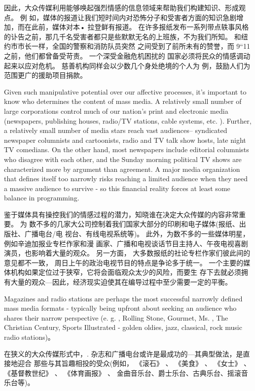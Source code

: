 \documentclass[cs4size, a4paper, 12pt]{article}
\newcounter{numpar}
\newcommand*{\newpar}{\numpar{}}
\begin{document}
	因此，大众传媒利用能够唤起强烈情感的信息领域来帮助我们构建知识、形成观点。 例 如，媒体的报道让我们短时间内对恐怖分子和受害者方面的知识急剧增加，而在此前，媒体对本• 拉登鲜有报道。 在许多报纸发布一系列带点轶事风格的讣告之前，那几千名受害者都只是些默默无名的上班族，不为我们所知。 和纽约市市长一样，全国的警察和消防队员突然 之间受到了前所未有的赞誉，而 9``11 之前，他们都曾备受苛责。 一个深受金融危机困扰的 国家必须将民众的情感调动起来以应对危机。  慈善机构同样会以少数几个身处绝境的个人为 例，鼓励人们为范围更广的援助项目捐款。  
	
	\newpar Given such manipulative potential over our affective processes, it's important to know who determines the content of mass media. A relatively  small number of large corporations control much of our nation's print and electronic media (newspapers, publishing houses, radio/TV stations, cable systems, etc. ). Further, a relatively small number of media stars reach vast audiences-- syndicated newspaper columnists and cartoonists, radio and TV talk show hosts, late night TV comedians. On the other hand,  most newspapers include editorial columnists who disagree with each other, and the Sunday morning political TV shows are characterized more by argument than agreement. A major media organization that defines itself too narrowly risks reaching a limited audience when they need a massive audience to survive - so this financial reality forces at least some balance in programming. 
	
	鉴于媒体具有操控我们的情感过程的潜力，知晓谁在决定大众传媒的内容非常重要。 为 数不多的几家大公司控制着我们国家大部分的印刷和电子媒体(报纸、出版社、广播电台/电 视台、有线电视系统等)。 此外，为数不多的一些媒体明星，例如辛迪加报业专栏作家和漫 画家、广播和电视谈话节目主持人、午夜电视喜剧演员，也影响着大量的观众。 另一方面， 大多数报纸的社论专栏作家们彼此间的意见都不一致， 周日上午的政治电视节目的特点是争论多于统一。 一个主要的媒体机构如果定位过于狭窄，它将会面临观众太少的风险，而要生 存下去就必须拥有大量的观众—因此，经济现实迫使其在编导过程中至少需要一定的平衡。 
	
	\newpar Magazines and radio stations are perhaps the most successful narrowly defined mass media formats - typically being upfront about seeking an audience who shares their narrow perspective (e. g. , Rolling Stone, Gourmet, Ms. , The Christian Century, Sports Illustrated - golden oldies, jazz, classical, rock music radio stations)。 
	
	在狭义的大众传媒形式中，. 杂志和广播电台或许是最成功的—其典型做法，是直接地迎合 那些与其旨趣相投的受众(例如， 《滚石》 、 《美食》 、 《女士》 、 《基督教世纪》 、 《体育画报》 、 金曲音乐台、爵士乐台、古典乐台、摇滚音乐台等)。  
	
\end{document}
